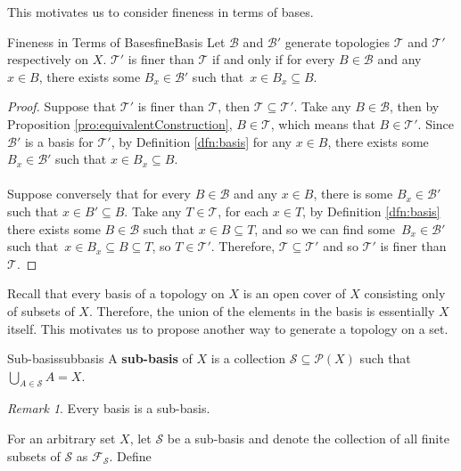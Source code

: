 \documentclass[math, code]{amznotes}
\theoremstyle{remark}
\newtheorem*{remark}{Remark}
\begin{document}
This motivates us to consider fineness in terms of bases.
\begin{probox}{Fineness in Terms of Bases}{fineBasis}
    Let $\mathcal{B}$ and $\mathcal{B}'$ generate topologies $\mathcal{T}$ and $\mathcal{T}'$ respectively on $X$. $\mathcal{T}'$ is finer than $\mathcal{T}$ if and only if for every $B \in \mathcal{B}$ and any $x \in B$, there exists some $B_x \in \mathcal{B}'$ such that~$x \in B_x \subseteq B$.
    \tcblower
    \begin{proof}
        Suppose that $\mathcal{T}'$ is finer than $\mathcal{T}$, then $\mathcal{T} \subseteq \mathcal{T}'$. Take any $B \in \mathcal{B}$, then by Proposition \ref{pro:equivalentConstruction}, $B \in \mathcal{T}$, which means that $B \in \mathcal{T}'$. Since $\mathcal{B}'$ is a basis for $\mathcal{T}'$, by Definition \ref{dfn:basis} for any $x \in B$, there exists some $B_x \in \mathcal{B}'$ such that $x \in B_x \subseteq B$.
        \\\\
        Suppose conversely that for every $B \in \mathcal{B}$ and any $x \in B$, there is some $B_x \in \mathcal{B}'$ such that $x \in B' \subseteq B$. Take any $T \in \mathcal{T}$, for each $x \in T$, by Definition \ref{dfn:basis} there exists some $B \in \mathcal{B}$ such that $x \in B \subseteq T$, and so we can find some~$B_x \in \mathcal{B}'$ such that~$x \in B_x \subseteq B \subseteq T$, so $T \in \mathcal{T}'$. Therefore, $\mathcal{T} \subseteq \mathcal{T}'$ and so $\mathcal{T}'$ is finer than~$\mathcal{T}$.
    \end{proof}
\end{probox}
Recall that every basis of a topology on $X$ is an open cover of $X$ consisting only of subsets of $X$. Therefore, the union of the elements in the basis is essentially $X$ itself. This motivates us to propose another way to generate a topology on a set.
\begin{dfnbox}{Sub-basis}{subbasis}
    A {\color{red} \textbf{sub-basis}} of $X$ is a collection $\mathcal{S} \subseteq \mathcal{P}\left(X\right)$ such that $\bigcup_{A \in \mathcal{S}}A = X$.
\end{dfnbox}
\begin{notebox}
    \begin{remark}
        Every basis is a sub-basis.
    \end{remark}
\end{notebox}
For an arbitrary set $X$, let $\mathcal{S}$ be a sub-basis and denote the collection of all finite subsets of $\mathcal{S}$ as $\mathcal{F}_{\mathcal{S}}$. Define 
\end{document}
